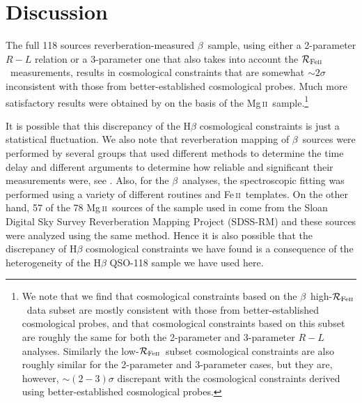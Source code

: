 \documentclass[a4paper,fleqn,usenatbib]{mnras}
\newcommand{\rfe}{${\cal R}_{\rm{Fe\textsc{ii}}}$}
\newcommand{\Feii}{Fe\,\textsc{ii}}
\newcommand{\Mgii}{Mg\,\textsc{ii}}
\newcommand{\hb}{{\sc{H}}$\beta$\/}
\begin{document}
\section{Discussion}
\label{sec:discussion}

The full 118 sources reverberation-measured \hb\ sample, using either a 2-parameter $R-L$ relation or a 3-parameter one that also takes into account the \rfe\ measurements, results in cosmological constraints that are somewhat {\bf $\sim 2\sigma$} inconsistent with those from better-established cosmological probes. Much more satisfactory results were obtained by \citet{khadka2021} on the basis of the \Mgii\ sample.\footnote{We note that we find that cosmological constraints based on the \hb\ high-\rfe\ data subset are mostly consistent with those from better-established cosmological probes, and that cosmological constraints based on this subset are roughly the same for both the 2-parameter and 3-parameter $R-L$ analyses. Similarly the low-\rfe\ subset cosmological constraints are also roughly similar for the 2-parameter and 3-parameter cases, but they are, however, $\sim(2-3)\sigma$ discrepant with the cosmological constraints derived using better-established cosmological probes.} 

It is possible that this discrepancy of the H$\beta$ cosmological constraints is just a statistical fluctuation. We also note that reverberation mapping of \hb\ sources were performed by several groups that used different methods to determine the time delay and different arguments to determine how reliable and significant their measurements were, see \citet{zajacek2019}. Also, for the \hb\ analyses, the spectroscopic fitting was performed using a variety of different routines and \Feii\ templates. On the other hand, 57 of the 78 \Mgii\  sources of the sample used in \citet{khadka2021} come from the Sloan Digital Sky Survey Reverberation Mapping Project (SDSS-RM) \citep{Homayouni2020} and these sources were analyzed using the same method. Hence it is also possible that the discrepancy of H$\beta$ cosmological constraints we have found is a consequence of the heterogeneity of the H$\beta$ QSO-118 sample we have used here. 
\end{document}
